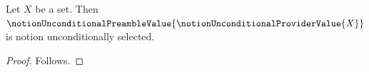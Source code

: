 

\begin{proposition}\label{notion_unconditional_provider_imported}
    Let $X$ be a set.
    Then $\notionUnconditionalPreambleValue{
        \notionUnconditionalProviderValue{X}}$
        is notion unconditionally selected.
\end{proposition}
\begin{proof}
    Follows.
\end{proof}
